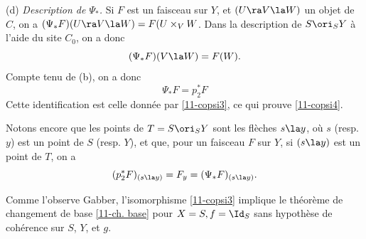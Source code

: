 \documentclass[10pt]{../fichiers-configuration-latex/smfart}
\begin{document}
\medskip (d) \textit{Description de $\Psi_*$.} Si $F$ est un faisceau sur $Y$, et $(U \ra V \la W)$
un objet de $C$, on a $(\Psi_*F)(U \ra V \la W) = F(U \times_V W$. Dans la description de $S \ori_S
Y$ à l'aide du site $C_0$, on a donc $$ (\Psi_*F)(V \la W) = F(W).  $$ Compte tenu de (b), on a donc
$$ \Psi_*F = p_2^*F $$ Cette identification est celle donnée par \ref{11-copsi3}, ce qui prouve
\ref{11-copsi4}.

Notons encore que les points de $T = S \ori_S Y$ sont les flèches $s \la y$, où $s$ (resp. $y$) est
un point de $S$ (resp. $Y$), et que, pour un faisceau $F$ sur $Y$, si $(s \la y)$ est un point de
$T$, on a $$ (p_2^*F)_{(s \la y)} = F_y = (\Psi_*F)_{(s \la y)}.  $$

\begin{remarque}
Comme l'observe Gabber, l'isomorphisme \ref{11-copsi3} implique le théorème de
changement de base \ref{11-ch. base} pour $X = S, f = \Id_S$ sans hypothèse de cohérence sur $S$,
$Y$, et $g$.
\end{remarque}

\ifx\danslelivre\undefined


\end{document}
